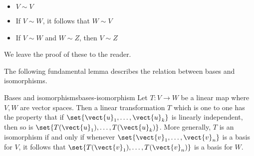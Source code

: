\begin{itemize}
\item $V\sim V$

\item If $V\sim W$, it follows that $W\sim V$

\item If $V\sim W$ and $W\sim Z$, then $V\sim Z$
\end{itemize}

We leave the proof of these to the reader. 

The following fundamental lemma describes the relation between bases and
isomorphisms.

\begin{lemma}{Bases and isomorphisms}{bases-isomorphism}
Let $T:V\rightarrow W$ be a
 linear map where $V,W$ are vector spaces.  Then a linear transformation $T$ which is one to one has the property that
if $\set{\vect{u}_{1},\ldots,\vect{u}_{k}} $ is linearly
independent, then so is $\set{T(\vect{u}_{1}),\ldots,T(\vect{u}_{k})}$.
 More generally, $T$ is an
isomorphism if and only if whenever $\set{
\vect{v}_{1},\ldots,\vect{v}_{n}} $ is a basis for $V$, it follows
that $\set{T(\vect{v}_{1}),\ldots,T(\vect{v}_{n})} $ is a basis for $W$.
\end{lemma}

